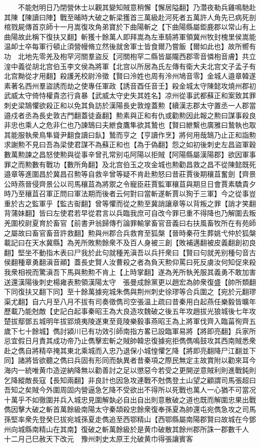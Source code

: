　　不能尅明日乃閉營休士以觀其變知賊意稍懈【懈居隘翻】乃濳夜勒兵雞鳴馳赴其陳【陳讀曰陣】戰至晡時大破之斬梁獲首三萬級赴河死者五萬許人角先已病死剖棺戮屍傳首京師十一月嵩復攻角弟寶於下曲陽斬之【下曲陽縣屬鉅鹿郡以常山有上曲陽故此稱下復扶又翻】斬獲十餘萬人即拜嵩為左車騎將軍領冀州牧封槐里侯嵩能温卹士卒每軍行頓止須營幔脩立然後就舍軍士皆食爾乃嘗飯【爾如此也】故所嚮有功　北地先零羌及枹罕河關羣盜反【河關枹罕二縣皆屬隴西郡零音憐枹音膚】共立湟中義從胡北宫伯玉李文侯為將軍【北宫以所居為氏左傳有衛大夫北宫文子孟子有北宫黝從才用翻】殺護羌校尉泠徵【賢曰泠姓也周有泠州鳩音零】金城人邉章韓遂素著名西州羣盜誘而劫之使專任軍政【誘音酉任音壬】殺金城太守陳懿攻燒州郡初武威太守倚恃權貴恣行貪暴【武威太守史失其姓名】凉州從事武都蘇正和案致其罪刺史梁鵠懼欲殺正和以免其負訪於漢陽長史敦煌蓋勲【續漢志郡太守置丞一人郡當邉戍者丞為長史敦古門翻蓋徒盍翻】勲素與正和有仇或勸勲因此報之勲曰謀事殺良非忠也乘人之危非仁也乃諫鵠曰夫紲食鷹隼欲其鷙也【賢曰紲繫也廣雅曰鷙執也取其能服執衆鳥隼聳尹翻食讀曰飤】鷙而亨之【亨讀作烹】將何用哉鵠乃止正和詣勲求謝勲不見曰吾為梁使君謀不為蘇正和也【為于偽翻】怨之如初後刺史左昌盜軍穀數萬勲諫之昌怒使勲與從事辛曾孔常别屯阿陽以拒賊【阿陽縣屬漢陽郡】欲因軍事罪之而勲數有戰功【數所角翻】及北宫伯玉之攻金城也勲勸昌救之昌不從陳懿既死邉章等進圍昌於冀昌召勲等自救辛曾等疑不肯赴勲怒曰昔莊賈後期穰苴奮劍【齊景公時燕晉侵齊景公以司馬穰苴為將禦之令寵臣莊賈監軍穰苴與期旦日會賈素驕貴夕時乃至穰苴召軍正問曰軍法期而後者云何對曰當斬遂斬賈以狥于三軍】今之從事豈重於古之監軍乎【監古䘖翻】曾等懼而從之勲至冀誚讓章等以背叛之罪【誚才笑翻背蒲妹翻】皆曰左使君若早從君言以兵臨我庶可自改今罪已重不得降也乃解圍去叛羌圍校尉夏育於畜官【前書尹翁歸傳冇論罪輸掌畜官音義曰右扶風畜牧所在有苑師之屬故曰畜官畜音許救翻】勲與州郡合兵救育至狐槃【晉時秦苻生葬姚弋仲於狐槃載記曰在天水冀縣】為羌所敗勲餘衆不及百人身被三創【敗補邁翻被皮義翻創初良翻】堅坐不動指木表曰尸我於此句就種羌滇吾以兵扞衆曰【賢曰句就羌别種句音古侯翻種章勇翻滇音顚】蓋長史賢人汝曹殺之者為負天勲仰罵曰死反虜汝何知促來殺我衆相視而驚滇吾下馬與勲勲不肯上【上時掌翻】遂為羌所執羌服其義勇不敢加害送還漢陽後刺史楊雍表勲領漢陽太守　張曼成餘黨更以趙宏為帥衆復盛【帥所類翻下同復扶又翻下同】至十餘萬據宛城朱儁與荆州刺史徐璆等合兵圍之【宛於元翻璆渠尤翻】自六月至八月不拔有司奏徵儁司空張温上疏曰昔秦用白起燕任樂毅皆曠年歷載乃能尅敵【史記白起事秦昭王為大良造攻魏破之後五年攻趙拔光狼城後七年攻楚拔鄢鄧五城明年拔郢燒夷陵遂東至竟陵樂毅事燕昭王為上將軍伐齊入臨菑徇齊五歲下七十餘城】儁討潁川已有功效引師南指方畧已設臨軍易將【將即亮翻】兵家所忌宜假日月責其成功帝乃止儁擊宏斬之賊帥韓忠復據宛拒儁儁鳴鼓攻其西南賊悉衆赴之儁自將精卒掩其東北乘城而入忠乃退保小城惶懼乞降【將即亮翻降尸江翻並下同】諸將皆欲聽之儁曰兵固有形同而埶異者昔秦項之際民無定主故賞附以勸來耳今海内一統唯黄巾造逆納降無以勸善討之足以懲惡今若受之更開逆意賊利則進戰鈍則乞降縱敵長寇【長知兩翻】非良計也因急攻連戰不尅儁登土山望之顧謂司馬張超曰吾知之矣賊今外圍周固内營逼急乞降不受欲出不得所以死戰也萬人一心猶不可當况十萬乎不如徹圍并兵入城忠見圍解埶必自出自出則意散破之道也既而解圍忠果出戰儁因擊大破之斬首萬餘級南陽太守秦頡殺忠餘衆復奉孫夏為帥還屯宛儁急攻之司馬孫堅率衆先登癸巳拔宛城孫夏走儁追至西鄂精山【西鄂縣屬南陽郡賢曰故城在今鄧州向城縣南精山在其南】復破之斬萬餘級於是黄巾破散其餘州郡所誅一郡數千人　十二月己巳赦天下改元　豫州刺史太原王允破黄巾得張讓賓客